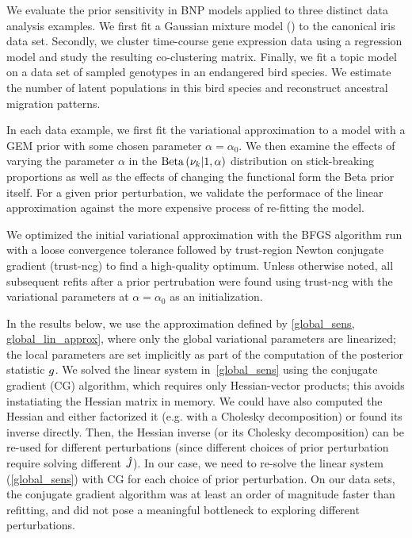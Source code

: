 We evaluate the prior sensitivity in BNP models applied to three distinct data analysis examples.
We first fit a Gaussian mixture model () to the canonical iris data set.
Secondly, we cluster time-course gene expression data using a regression model
and study the resulting co-clustering matrix.
Finally, we fit a topic model
on a data set of sampled genotypes in an endangered bird species.
We estimate the number of latent populations in this
bird species and reconstruct ancestral migration patterns.

In each data example, we first fit the variational approximation to a model
with a GEM prior with some chosen parameter $\alpha = \alpha_0$.
We then examine the effects of varying the parameter $\alpha$
in the $\mathrm{Beta}\left(\nu_{k} \vert 1, \alpha\right)$ distribution on stick-breaking proportions
as well as
the effects of changing the functional form the Beta prior itself.
For a given prior perturbation,
we validate the performace of the linear approximation against
the more expensive process of re-fitting the model.



We optimized the initial variational approximation with
the BFGS algorithm run with a loose convergence tolerance
followed by trust-region Newton conjugate gradient (trust-ncg) to find a high-quality optimum.
Unless otherwise noted, all subsequent refits after a prior pertrubation were found
using trust-ncg with the variational parameters at $\alpha = \alpha_0$ as an initialization.

In the results below, we use
the approximation defined by \eqref{global_sens, global_lin_approx},
where only the global variational parameters are linearized;
the local parameters are set implicitly as part of the
computation of the posterior statistic $g$.
We solved the linear system in~\eqref{global_sens} using
the conjugate gradient (CG) algorithm, which requires only Hessian-vector products;
this avoids instatiating the Hessian matrix in memory.
We could have also computed the Hessian and
either factorized it (e.g. with a Cholesky decomposition) or found its inverse directly.
Then, the Hessian inverse (or its Cholesky decomposition) can
be re-used for different perturbations
(since different choices of prior perturbation
require solving different $\hat J$).
In our case, we need to re-solve the linear system (\eqref{global_sens}) with
CG for each choice of prior perturbation.
On our data sets, the conjugate gradient algorithm was at least
an order of magnitude faster than refitting, and did not pose a meaningful bottleneck
to exploring different perturbations.

